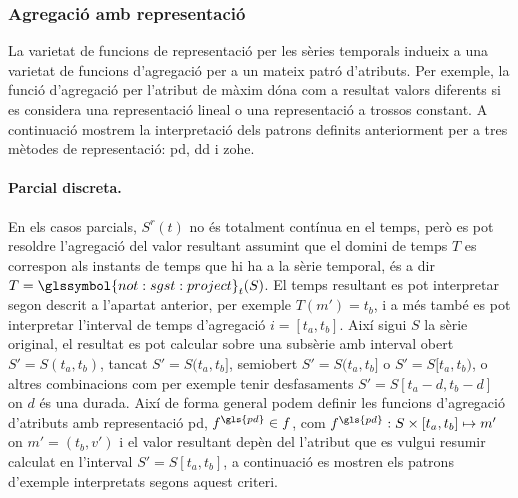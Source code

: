 





\subsubsection{Agregació amb representació}

La varietat de funcions de representació per les sèries temporals
indueix a una varietat de funcions d'agregació per a un mateix patró
d'atributs. Per exemple, la funció d'agregació per l'atribut de màxim
dóna com a resultat valors diferents si es considera una representació
lineal o una representació a trossos constant. A continuació mostrem
la interpretació dels patrons definits anteriorment per a tres mètodes de
representació: \gls{pd}, \gls{dd} i \gls{zohe}.


\paragraph{Parcial discreta.}
En els casos parcials, $S^r(t)$ no és totalment contínua en el temps,
però es pot resoldre l'agregació del valor resultant assumint que el
domini de temps $T$ es correspon als instants de temps que hi ha a la
sèrie temporal, és a dir $T=\glssymbol{not:sgst:project}_{t}(S)$.  El
temps resultant es pot interpretar segon descrit a l'apartat anterior,
per exemple $T(m')=t_b$, i a més també es pot interpretar l'interval
de temps d'agregació $i=[t_a,t_b]$. Així sigui $S$ la sèrie original,
el resultat es pot calcular sobre una subsèrie amb interval obert
$S'=S(t_a,t_b)$, tancat $S'=S(t_a,t_b]$, semiobert $S'=S(t_a,t_b]$ o
$S'=S[t_a,t_b)$, o altres combinacions com per exemple tenir
desfasaments $S'=S[t_a-d,t_b-d]$ on $d$ és una durada.  Així de forma
general podem definir les funcions d'agregació d'atributs amb
representació \gls{pd}, $f^{\gls{pd}}\in f$, com $f^{\gls{pd}}: S
\times [t_a,t_b] \mapsto m'$ on $m'=(t_b,v')$ i el valor resultant
depèn del l'atribut que es vulgui resumir calculat en l'interval
$S'=S[t_a,t_b]$, a continuació es mostren els patrons d'exemple
interpretats segons aquest criteri.

